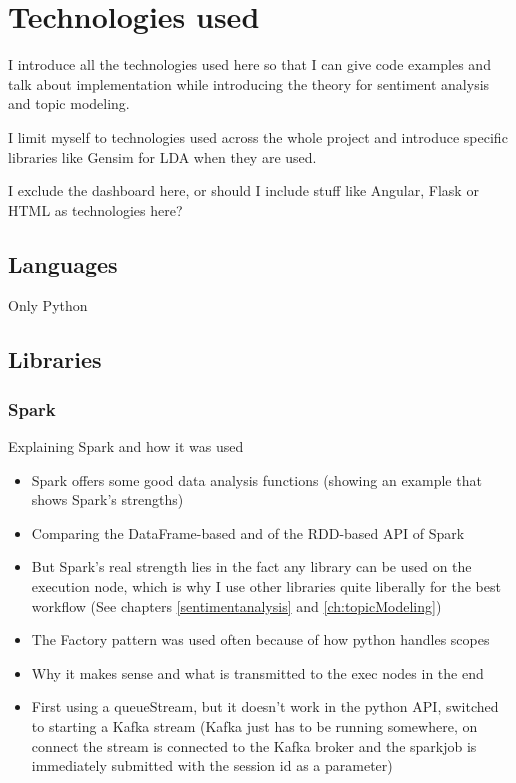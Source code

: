 
\chapter{Technologies used}
\label{ch:technologiesUsed}

I introduce all the technologies used here
so that I can give code examples and talk about implementation
while introducing the theory for sentiment analysis and topic modeling.

I limit myself to technologies used across the whole project and introduce specific libraries like Gensim for LDA when they are used.

I exclude the dashboard here, or should I include stuff like Angular, Flask or HTML as technologies here?

\section{Languages}
\label{sec:languages}

Only Python

\section{Libraries}
\label{sec:libraries}

\subsection{Spark}
\label{subsec:spark}

Explaining Spark and how it was used
\begin{itemize}
    \item
    Spark offers some good data analysis functions (showing an example that shows Spark's strengths) %
    \item
    Comparing the DataFrame-based and of the RDD-based API of Spark
    \item
    But Spark's real strength lies in the fact any library can be used on the execution node, which is why I use other libraries quite liberally for the best workflow (See chapters \ref{sentimentanalysis} and \ref{ch:topicModeling})
    \item
    The Factory pattern was used often because of how python handles scopes
    \item
    Why it makes sense and what is transmitted to the exec nodes in the end
    \item
    First using a queueStream, but it doesn’t work in the python API, switched to starting a Kafka stream (Kafka just has to be running somewhere, on connect the stream is connected to the Kafka broker and the sparkjob is immediately submitted with the session id as a parameter)
\end{itemize}


